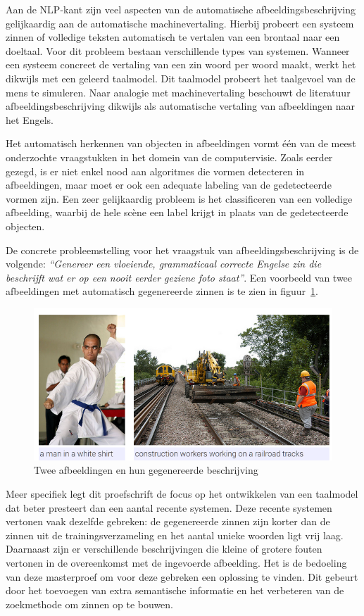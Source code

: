 Aan de NLP-kant zijn veel aspecten van de automatische afbeeldingsbeschrijving gelijkaardig aan de automatische machinevertaling. Hierbij probeert een systeem zinnen of volledige teksten automatisch te vertalen van een brontaal naar een doeltaal. Voor dit probleem bestaan verschillende types van systemen. Wanneer een systeem concreet de vertaling van een zin woord per woord maakt, werkt het dikwijls met een geleerd taalmodel. Dit taalmodel probeert het taalgevoel van de mens te simuleren. Naar analogie met machinevertaling beschouwt de literatuur afbeeldingsbeschrijving dikwijls als automatische vertaling van afbeeldingen naar het Engels.

Het automatisch herkennen van objecten in afbeeldingen vormt \'e\'en van de meest onderzochte vraagstukken in het domein van de computervisie. Zoals eerder gezegd, is er niet enkel nood aan algoritmes die vormen detecteren in afbeeldingen, maar moet er ook een adequate labeling van de gedetecteerde vormen zijn. Een zeer gelijkaardig probleem is het classificeren van een volledige afbeelding, waarbij de hele sc\`ene een label krijgt in plaats van de gedetecteerde objecten.

De concrete probleemstelling voor het vraagstuk van afbeeldingsbeschrijving is de volgende: \emph{``Genereer een vloeiende, grammaticaal correcte Engelse zin die beschrijft wat er op een nooit eerder geziene foto staat''}. Een voorbeeld van twee afbeeldingen met automatisch gegenereerde zinnen is te zien in figuur~\ref{fig:examplecaptions}.

\begin{figure}[tb]
	\centering
	\includegraphics[width= 0.85\linewidth]{Images/caption.png}
	\caption{Twee afbeeldingen en hun gegenereerde beschrijving}
	\label{fig:examplecaptions}
\end{figure}

Meer specifiek legt dit proefschrift de focus op het ontwikkelen van een taalmodel dat beter presteert dan een aantal recente systemen. Deze recente systemen vertonen vaak dezelfde gebreken: de gegenereerde zinnen zijn korter dan de zinnen uit de trainingsverzameling en het aantal unieke woorden ligt vrij laag. Daarnaast zijn er verschillende beschrijvingen die kleine of grotere fouten vertonen in de overeenkomst met de ingevoerde afbeelding. Het is de bedoeling van deze masterproef om voor deze gebreken een oplossing te vinden. Dit gebeurt door het toevoegen van extra semantische informatie en het verbeteren van de zoekmethode om zinnen op te bouwen.


